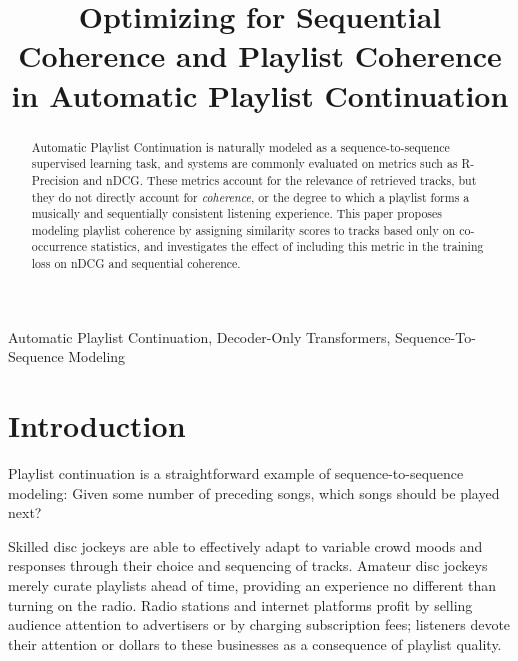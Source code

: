\documentclass[conference]{IEEEtran}
\begin{document}
\title{Optimizing for Sequential Coherence and Playlist Coherence in Automatic Playlist Continuation}

\author{
}
\maketitle

\begin{abstract}
Automatic Playlist Continuation is naturally modeled as a sequence-to-sequence supervised learning task, and systems are 
commonly evaluated on metrics such as R-Precision and nDCG. These metrics account for the relevance of retrieved tracks, 
but they do not directly account for \textit{coherence}, or the degree to which a playlist forms a musically and sequentially 
consistent listening experience. This paper proposes modeling playlist coherence by assigning similarity scores to tracks based only
on co-occurrence statistics, and investigates the effect of including this metric in the training loss on nDCG and sequential coherence.
\end{abstract}

\begin{IEEEkeywords}
Automatic Playlist Continuation, Decoder-Only Transformers, Sequence-To-Sequence Modeling
\end{IEEEkeywords}

\section{Introduction}

Playlist continuation is a straightforward example of sequence-to-sequence modeling: Given some number of preceding songs, which songs should be played next?

Skilled disc jockeys are able to effectively adapt to variable crowd moods and responses through their choice and sequencing of tracks. 
Amateur disc jockeys merely curate playlists ahead of time, providing an experience no different than turning on the radio.
Radio stations and internet platforms profit by selling audience attention to advertisers or by charging subscription fees;
listeners devote their attention or dollars to these businesses as a consequence of playlist quality.
\end{document}
